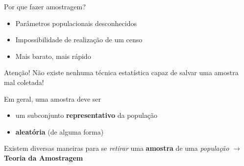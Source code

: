 \documentclass[10pt]{beamer}
\theoremstyle{definition}
\begin{document}
\begin{frame}{Por que fazer amostragem?}
  \begin{itemize}
  \item Parâmetros populacionais desconhecidos
  \item Impossibilidade de realização de um censo
  \item Mais barato, mais rápido
  \end{itemize}\pause
  \begin{alertblock}{Atenção!}
    Não existe nenhuma técnica estatística capaz de salvar uma amostra
    mal coletada!
  \end{alertblock}\pause
  Em geral, uma amostra deve ser
  \begin{itemize}
  \item um subconjunto \textbf{representativo} da população
  \item \textbf{aleatória} (de alguma forma)
  \end{itemize}
  Existem diversas maneiras para se \textit{retirar} uma
  \textbf{amostra} de uma \textit{população} $\rightarrow$
  \textbf{Teoria da Amostragem}
\end{frame}



\end{document}
